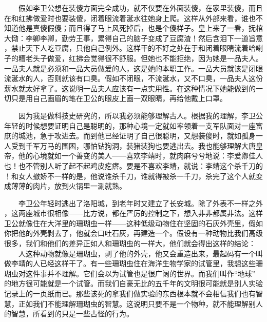  　　假如李卫公想在装傻方面完全成功，就不仅要在外面装傻，在家里装傻，而且 在和红拂做爱时也要装傻，闭着眼流着涎水往她身上爬。这样从外部来看，谁也不 知道他是真傻假傻；而且得了马上风死掉后，也是个傻样子。皇上来了一看，抚棺 大恸：李卿李卿，勤劳王事，累得自己的脑子变成了豆腐渣！然后含泪下一道旨意 ，禁止天下人吃豆腐，只他自己例外。这样干的不好之处在于和闭着眼睛流着哈喇 子的糟老头子做爱，红拂会觉得很不舒服。但她也不能拒绝，因为她是一品夫人。 一品夫人就是必须和一品大员做爱的人，这是她的本职工作。一品大员就该是闭眼 流涎水的人，否则就该有口臭。假如不闭眼，不流涎水，又不口臭，一品夫人这份 薪水就太好拿了。这说明一品夫人应该有一点实用性。在这种情况下她能做到的一 切只是用自己画眉的笔在卫公的眼皮上画一双眼睛，再给他戴上口罩。

 　　因为我是做科技史研究的，所以我必须能够理解古人。根据我的理解，李卫公 年轻的时候想要证明自己是聪明的，那种心境一定就如率领着一支军队面对一座富 庶的城池，急于攻进去。而到他已经证明了自己很聪明，又想装傻时，就如孤身一 人受到千军万马的围困，哪怕钻狗洞，装猪装狗也要逃出去。我也能够理解大唐皇 帝，他的心境就如一个善变的美人——喜欢李靖时，就肉麻兮兮地说：李爱卿佳人 也！也不管别人听了起不起鸡皮疙瘩。要是不喜欢李靖，就说：李靖这个杀千刀的 ！和女人撤娇不一样的是，他说谁杀千刀，谁就得被杀一千刀，杀完了这个人就变 成薄薄的肉片，放到火锅里一涮就熟。

 　　李卫公年轻时逃出了洛阳城，到老年时又建立了长安城。除了外表不一样之外 ，这两座城市很相像——比方说，都在严厉的控制之下，想入非非都属非法。这样 卫公就像住在大洋里的珊瑚虫一样——这种低级动物住在坚固的石灰外壳里，假如 你把他的外壳剥去了，他就会口吐石灰，再建造一个。假设有一种动物比我们高级 很多，我们和他们的差异正如人和珊瑚虫的一样大，他们就会得出这样的结论： 　　人这种动物就像是珊瑚虫，剥了他的外壳，他又会重造出来，最起码有一个叫 做李靖的人已经这样干了。有一些珊瑚虫住在海洋生物学家的试管里，我想这些珊 瑚虫对这件事并不理解。它们会以为试管也是很广阔的世界。而我们叫作“地球” 的地方很可能就是一个试管。而我们自豪无比的五千年的文明很可能就是别人实验 记录上的一页纸而已。那些该死的拿我们做实验的东西根本就不会相信我们也有智 慧，正如我们不能理解珊瑚虫的智慧。这说明只要不是一个物种，就不能理解别人 的智慧，所看到的只是一些古怪的行为。

